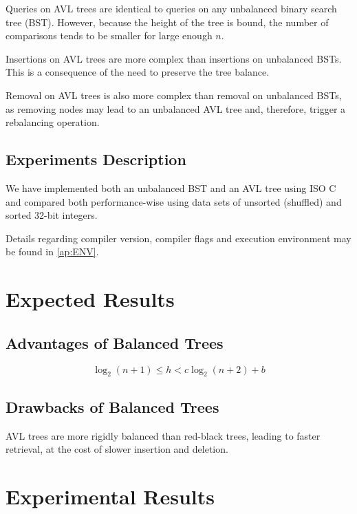 \documentclass[12pt]{elsarticle}
\begin{document}
Queries on AVL trees are identical to queries on any unbalanced binary search
tree (BST). However, because the height of the tree is bound, the number of
comparisons tends to be smaller for large enough \(n\).

Insertions on AVL trees are more complex than insertions on unbalanced BSTs.
This is a consequence of the need to preserve the tree balance.

Removal on AVL trees is also more complex than removal on unbalanced BSTs, as
removing nodes may lead to an unbalanced AVL tree and, therefore, trigger a
rebalancing operation.

\subsection{Experiments Description}

We have implemented both an unbalanced BST and an AVL tree using ISO C and
compared both performance-wise using data sets of unsorted (shuffled) and sorted
32-bit integers.

Details regarding compiler version, compiler flags and execution environment
may be found in \ref{ap:ENV}.

\section{Expected Results}



\subsection{Advantages of Balanced Trees}

\begin{equation} \label{eq:AVLH}
    \log_2 \left(n + 1\right) \leq h < c \log_2 \left(n + 2\right) + b
\end{equation}

\subsection{Drawbacks of Balanced Trees}

AVL trees are more rigidly balanced than red-black trees, leading to faster
retrieval, at the cost of slower insertion and deletion.

\section{Experimental Results}
\end{document}

